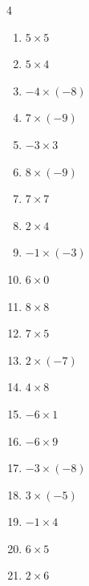 \begin{multicols}{4}
\begin{enumerate}
  \item $5\times 5$
        \phantom{$=25$}

  \item $5\times 4$
        \phantom{$=20$}

\columnbreak %

  \item $-4\times (-8)$
        \phantom{$=32$}

  \item $7\times (-9)$
        \phantom{$=-63$}

  \item $-3\times 3$
        \phantom{$=-9$}

  \item $8\times (-9)$
        \phantom{$=-72$}

  \item $7\times 7$
        \phantom{$=49$}

  \item $2\times 4$
        \phantom{$=8$}

  \item $-1\times (-3)$
        \phantom{$=3$}

  \item $6\times 0$
        \phantom{$=0$}

  \item $8\times 8$
        \phantom{$=64$}

  \item $7\times 5$
        \phantom{$=35$}

  \item $2\times (-7)$
        \phantom{$=-14$}

  \item $4\times 8$
        \phantom{$=32$}

  \item $-6\times 1$
        \phantom{$=-6$}

  \item $-6\times 9$
        \phantom{$=-54$}

  \item $-3\times (-8)$
        \phantom{$=24$}

  \item $3\times (-5)$
        \phantom{$=-15$}

  \item $-1\times 4$
        \phantom{$=-4$}

  \item $6\times 5$
        \phantom{$=30$}

  \item $2\times 6$
        \phantom{$=12$}


\end{enumerate}
\end{multicols}
